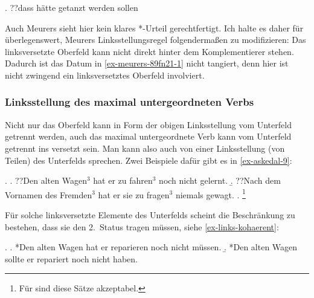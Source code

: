 \ex. \label{ex-meurers-89fn21-1} ??dass hätte getanzt werden sollen \hfill \citep[89, Fußnote 21]{Meurers:99}

Auch Meurers sieht hier kein klares *-Urteil gerechtfertigt. Ich halte es daher für überlegenswert, Meurers Linksstellungsregel folgenderma\ss en zu modifizieren: Das  linksversetzte Oberfeld kann nicht direkt hinter dem Komplementierer stehen. Dadurch ist das Datum in \ref{ex-meurers-89fn21-1} nicht tangiert, denn hier ist nicht zwingend ein linksversetztes Oberfeld involviert. 


\subsubsection*{Linksstellung des maximal untergeordneten Verbs}

Nicht nur das Oberfeld kann in Form der obigen Linksstellung vom Unterfeld getrennt werden, auch das maximal untergeordnete Verb kann vom Unterfeld getrennt ins  versetzt sein. Man kann also auch von einer Linksstellung (von Teilen) des Unterfelds sprechen. Zwei Beispiele dafür gibt es  in \ref{ex-askedal-9}:

\ex. \label{ex-askedal-9}
\a. ??Den alten Wagen$^3$ hat er zu fahren$^3$ noch nicht gelernt.
\b. ??Nach dem Vornamen des Fremden$^3$ hat er sie zu fragen$^3$ niemals gewagt.
\z. \citep[(9)]{Askedal:83}\footnote{Für \citet[238]{Meurers:99} sind diese Sätze akzeptabel.}

Für solche linksversetzte Elemente des Unterfelds scheint die Beschränkung zu bestehen, dass sie den 2.~Status tragen müssen, siehe \ref{ex-links-kohaerent}: 

\ex. \label{ex-links-kohaerent}
\a. *Den alten Wagen hat er reparieren noch nicht müssen. 
\b. *Den alten Wagen sollte er repariert noch nicht haben. 

